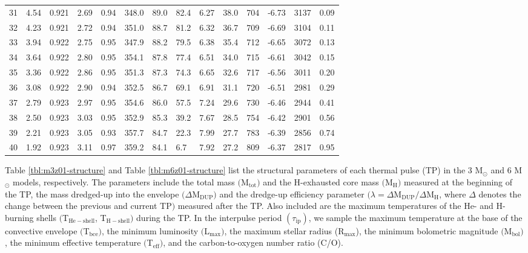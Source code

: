 \begin{table}[p!]
{\begin{minipage}{200mm}
\begin{tabular}{l l l l l l l l l l l l l l}
31	&	4.54	&	0.921	&	2.69	&	0.94	&	348.0	&	89.0	&	82.4	&	6.27	&	38.0	&	704	&	-6.73	&	3137	&	0.09\\
32	&	4.23	&	0.921	&	2.72	&	0.94	&	351.0	&	88.7	&	81.2	&	6.32	&	36.7	&	709	&	-6.69	&	3104	&	0.11\\
33	&	3.94	&	0.922	&	2.75	&	0.95	&	347.9	&	88.2	&	79.5	&	6.38	&	35.4	&	712	&	-6.65	&	3072	&	0.13\\
34	&	3.64	&	0.922	&	2.80	&	0.95	&	354.1	&	87.8	&	77.4	&	6.51	&	34.0	&	715	&	-6.61	&	3042	&	0.15\\
35	&	3.36	&	0.922	&	2.86	&	0.95	&	351.3	&	87.3	&	74.3	&	6.65	&	32.6	&	717	&	-6.56	&	3011	&	0.20\\
36	&	3.08	&	0.922	&	2.90	&	0.94	&	352.5	&	86.7	&	69.1	&	6.91	&	31.1	&	720	&	-6.51	&	2981	&	0.29\\
37	&	2.79	&	0.923	&	2.97	&	0.95	&	354.6	&	86.0	&	57.5	&	7.24	&	29.6	&	730	&	-6.46	&	2944	&	0.41\\
38	&	2.50	&	0.923	&	3.03	&	0.95	&	352.9	&	85.3	&	39.2	&	7.67	&	28.5	&	754	&	-6.42	&	2901	&	0.56\\
39	&	2.21	&	0.923	&	3.05	&	0.93	&	357.7	&	84.7	&	22.3	&	7.99	&	27.7	&	783	&	-6.39	&	2856	&	0.74\\
40	&	1.92	&	0.923	&	3.11	&	0.97	&	359.2	&	84.1	&	6.7	&	7.92	&	27.2	&	809	&	-6.37	&	2817	&	0.95\\
\hline
\end{tabular}
\end{minipage}}
\end{table}

\label{structure-labels}Table \ref{tbl:m3z01-structure} and Table \ref{tbl:m6z01-structure} list the structural parameters of each thermal pulse (TP) in the 3 M$_\odot$ and 6 M$_\odot$ models, respectively. The parameters include the total mass $($M$_{\mathrm{tot}})$ and the H-exhausted core mass $($M$_{\mathrm{H}})$ measured at the beginning of the TP, the mass dredged-up into the envelope $(\Delta$M$_{\mathrm{DUP}})$ and the dredge-up efficiency parameter $(\lambda=\Delta\mathrm{M}_{\mathrm{DUP}}/\Delta \mathrm{M}_{\mathrm{H}}$, where $\Delta$ denotes the change between the previous and current TP$)$ measured after the TP. Also included are the maximum temperatures of the He- and H-burning shells $($T$_{\mathrm{He-shell}}$, T$_{\mathrm{H-shell}})$ during the TP. In the interpulse period $(\tau_{\mathrm{ip}})$, we sample the maximum temperature at the base of the convective envelope $($T$_{\mathrm{bce}})$, the minimum luminosity $($L$_{\mathrm{max}})$, the maximum stellar radius (R$_{\mathrm{max}}$), the minimum bolometric magnitude $($M$_{\mathrm{bol}})$, the minimum effective temperature $($T$_{\mathrm{eff}})$, and the carbon-to-oxygen number ratio (C/O).

